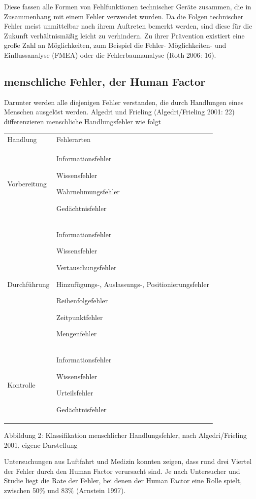 Diese fassen alle Formen von Fehlfunktionen technischer
Geräte zusammen, die in Zusammenhang mit einem Fehler
verwendet wurden. Da die Folgen technischer Fehler meist
unmittelbar nach ihrem Auftreten bemerkt werden, sind diese
für die Zukunft verhältnismäßig leicht zu verhindern. Zu
ihrer Prävention existiert eine große Zahl an
Möglichkeiten, zum Beispiel die Fehler- Möglichkeiten- und
Einflussanalyse (FMEA) oder die Fehlerbaumanalyse (Roth
2006: 16).




\subsection{menschliche Fehler, der Human Factor}

Darunter werden alle diejenigen Fehler verstanden, die durch
Handlungen eines Menschen ausgelöst werden. Algedri und
Frieling (Algedri/Frieling 2001: 22) differenzieren
menschliche Handlungsfehler wie folgt

\begin{tabularx}{\linewidth}{XX}
\centering Handlung &
\centering Fehlerarten\\
Vorbereitung &
Informationsfehler

Wissensfehler

Wahrnehmungsfehler

Gedächtnisfehler\\
Durchführung &
Informationsfehler

Wissensfehler

Vertauschungsfehler

Hinzufügungs-, Auslassungs-, Positionierungsfehler

Reihenfolgefehler

Zeitpunktfehler

Mengenfehler\\
Kontrolle &
Informationsfehler

Wissensfehler

Urteilsfehler

Gedächtnisfehler\\
\end{tabularx}
Abbildung 2: Klassifikation menschlicher Handlungsfehler,
nach Algedri/Frieling 2001, eigene Darstellung




Untersuchungen aus Luftfahrt und Medizin konnten zeigen,
dass rund drei Viertel der Fehler durch den Human Factor
verursacht sind. Je nach Untersucher und Studie liegt die
Rate der Fehler, bei denen der Human Factor eine Rolle
spielt, zwischen 50\% und 83\% (Arnstein 1997).




